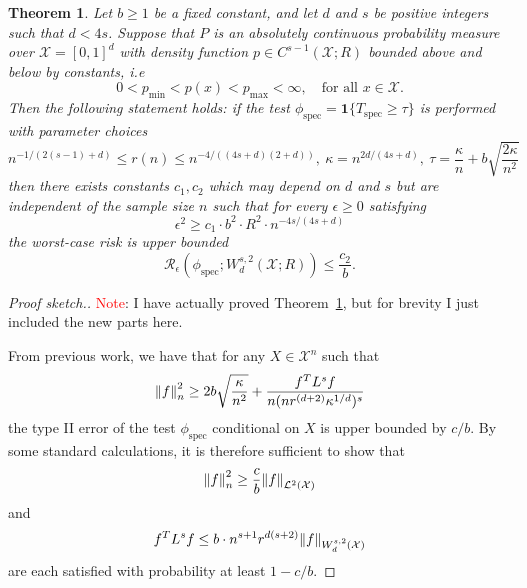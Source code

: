 \documentclass{article}
\newcommand{\1}{\mathbf{1}}
\newcommand{\Xset}{\mathcal{X}}
\newcommand{\Leb}{\mathcal{L}}
\newcommand{\spec}{\mathrm{spec}}
\theoremstyle{alden}
\theoremstyle{aldenthm}
\newtheorem{theorem}{Theorem}
\theoremstyle{definition}
\theoremstyle{remark}
\begin{document}
\begin{theorem}
	\label{thm:higher_order_sobolev_testing_rate}
	Let $b \geq 1$ be a fixed constant, and let $d$ and $s$ be positive integers such that $d < 4s$. Suppose that $P$ is an absolutely continuous probability measure over $\mathcal{X} = [0,1]^d$ with density function $p \in C^{s-1}(\mathcal{X};R)$ bounded above and below by constants, i.e
	\begin{equation*}
	0 < p_{\min} < p(x) < p_{\max} < \infty, \quad \textrm{for all $x \in \mathcal{X}$.}
	\end{equation*}
	Then the following statement holds: if the test $\phi_{\spec} = \1\{T_{\spec} \geq \tau \}$ is performed with parameter choices 
	\begin{equation*}
	n^{-1/(2(s - 1) + d)} \leq r(n) \leq n^{-4/((4s + d)(2+d))}, ~\kappa = n^{2d/(4s + d)}, ~\tau = \frac{\kappa}{n} + b\sqrt{\frac{2\kappa}{n^2}}
	\end{equation*}
	then there exists constants $c_1,c_2$ which may depend on $d$ and $s$ but are independent of the sample size $n$ such that for every $\epsilon \geq 0$ satisfying
	\begin{equation}
	\label{eqn:higher_order_sobolev_testing_rate}
	\epsilon^2 \geq c_1 \cdot b^2 \cdot R^2 \cdot n^{-4s/(4s + d)}
	\end{equation}
	the worst-case risk is upper bounded
	\begin{equation}
	\label{eqn:higher_order_sobolev_testing_rate_1}
	\mathcal{R}_{\epsilon}(\phi_{\mathrm{spec}}; W_d^{s,2}(\mathcal{X};R)) \leq \frac{c_2}{b}.
	\end{equation}
\end{theorem}
\begin{proof}[Proof sketch.]
	
	\textcolor{red}{Note}: I have actually proved Theorem~\ref{thm:higher_order_sobolev_testing_rate}, but for brevity I just included the new parts here. 
	
	From previous work, we have that for any $X \in \Xset^n$ such that
	\begin{equation*}
	\norm{f}_n^2 \geq 2b\sqrt{\frac{\kappa}{n^2}} + \frac{f^T L^s f}{n(nr^{(d + 2)}\kappa^{1/d})^s}
	\end{equation*}
	the type II error of the test $\phi_{\spec}$ conditional on $X$ is upper bounded by $c/b$. By some standard calculations, it is therefore sufficient to show that
	\begin{equation}
	\label{eqn:higher_order_sobolev_testing_rate_pf1}
	\norm{f}_n^2 \geq \frac{c}{b}\norm{f}_{\Leb^2(\Xset)}
	\end{equation}
	and
	\begin{equation}
	\label{eqn:higher_order_sobolev_testing_rate_pf2}
	f^T L^s f \leq b \cdot n^{s + 1} r^{d(s + 2)} \norm{f}_{W_d^{s,2}(\Xset)}
	\end{equation}
	are each satisfied with probability at least $1 - c/b$. 
\end{proof}
\end{document}
